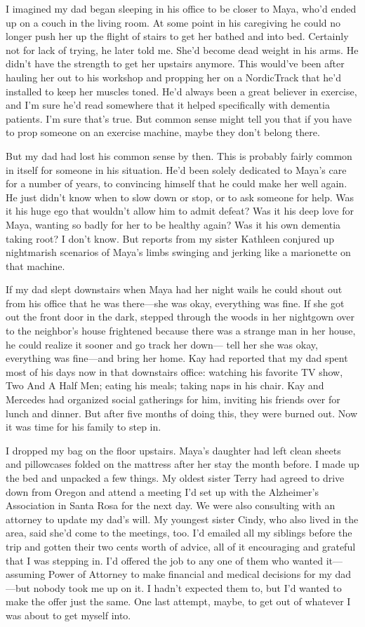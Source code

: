 \documentclass[12pt]{book}
\begin{document}
I imagined my dad began sleeping in his office to be closer to Maya, who'd ended up on a couch in the living room. At some point in his caregiving he could no longer push her up the flight of stairs to get her bathed and into bed. Certainly not for lack of trying, he later told me. She'd become dead weight in his arms. He didn't have the strength to get her upstairs anymore. This would've been after hauling her out to his workshop and propping her on a NordicTrack that he'd installed to keep her muscles toned. He'd always been a great believer in exercise, and I'm sure he'd read somewhere that it helped specifically with dementia patients. I'm sure that's true. But common sense might tell you that if you have to prop someone on an exercise machine, maybe they don't belong there.

But my dad had lost his common sense by then. This is probably fairly common in itself for someone in his situation. He'd been solely dedicated to Maya's care for a number of years, to convincing himself that he could make her well again. He just didn't know when to slow down or stop, or to ask someone for help. Was it his huge ego that wouldn't allow him to admit defeat? Was it his deep love for Maya, wanting so badly for her to be healthy again? Was it his own dementia taking root? I don't know. But reports from my sister Kathleen conjured up nightmarish scenarios of Maya's limbs swinging and jerking like a marionette on that machine.

If my dad slept downstairs when Maya had her night wails he could shout out from his office that he was there---she was okay, everything was fine. If she got out the front door in the dark, stepped through the woods in her nightgown over to the neighbor's house frightened because there was a strange man in her house, he could realize it sooner and go track her down--- tell her she was okay, everything was fine---and bring her home. Kay had reported that my dad spent most of his days now in that downstairs office: watching his favorite TV show, Two And A Half Men; eating his meals; taking naps in his chair. Kay and Mercedes had organized social gatherings for him, inviting his friends over for lunch and dinner. But after five months of doing this, they were burned out. Now it was time for his family to step in.

I dropped my bag on the floor upstairs. Maya's daughter had left clean sheets and pillowcases folded on the mattress after her stay the month before. I made up the bed and unpacked a few things. My oldest sister Terry had agreed to drive down from Oregon and attend a meeting I'd set up with the Alzheimer's Association in Santa Rosa for the next day. We were also consulting with an attorney to update my dad's will. My youngest sister Cindy, who also lived in the area, said she'd come to the meetings, too. I'd emailed all my siblings before the trip and gotten their two cents worth of advice, all of it encouraging and grateful that I was stepping in. I'd offered the job to any one of them who wanted it---assuming Power of Attorney to make financial and medical decisions for my dad---but nobody took me up on it. I hadn't expected them to, but I'd wanted to make the offer just the same. One last attempt, maybe, to get out of whatever I was about to get myself into.
\end{document}

